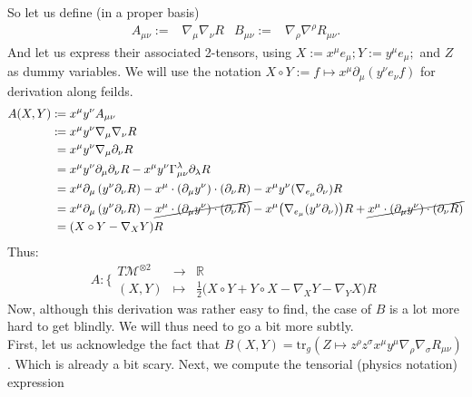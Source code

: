 \documentclass[a4paper,11pt]{article}
\begin{document}
\noindent So let us define (in a proper basis)
\begin{align}
    A_{\mu\nu} :=& \nabla_\mu\nabla_\nu R&
    B_{\mu\nu} :=& \nabla_\rho\nabla^\rho R_{\mu\nu}.
\end{align}
And let us express their associated 2-tensors, using $X:=x^\mu e_\mu; Y:=y^\mu e_\mu;$ and $Z$ as dummy variables. We will use the notation $X\circ Y:= f \mapsto x^\mu \partial_\mu (y^\nu e_\nu f)$ for derivation along feilds.
\begin{align*}
    A(X,Y) :\!\!&= x^\mu y^\nu A_{\mu\nu}\\
    :\!\!&= x^\mu y^\nu \nabla_\mu \nabla_\nu R\\
    &= x^\mu y^\nu \nabla_\mu \partial_\nu R\\
    &= x^\mu y^\nu \partial_\mu \partial_\nu R - x^\mu y^\nu \Gamma_{\mu\nu}^\lambda \partial_\lambda R\\
    &= x^\mu \partial_\mu \left(y^\nu \partial_\nu R \right) - x^\mu \cdot(\partial_\mu y^\nu) \cdot (\partial_\nu R) - x^\mu y^\nu (\nabla_{e_\mu} \partial_\nu)R\\
    &= x^\mu \partial_\mu \left(y^\nu \partial_\nu R \right) - \cancel{x^\mu \cdot(\partial_\mu y^\nu) \cdot (\partial_\nu R)} - x^\mu \big(\nabla_{e_\mu} (y^\nu \partial_\nu)\big)R + \cancel{x^\mu \cdot (\partial_\mu y^\nu) \cdot (\partial_\nu R)}\\
    &= (X\circ Y - \nabla_X Y) R
\end{align*}
Thus:
\begin{equation}
    A : \Bigg\{\begin{matrix}
        T\mathcal{M}^{\otimes 2} & \to & \mathbb{R}\\
        (X,Y) & \mapsto & \frac{1}{2}\big(X\circ Y + Y\circ X - \nabla_X Y - \nabla_Y X\big) R
    \end{matrix}
\end{equation}
Now, although this derivation was rather easy to find, the case of $B$ is a lot more hard to get blindly. We will thus need to go a bit more subtly.
\\
First, let us acknowledge the fact that $B(X,Y)=\mathrm{tr}_g(Z\mapsto z^\rho z^\sigma x^\mu y^\mu \nabla_\rho \nabla_\sigma R_{\mu\nu})$. Which is already a bit scary. Next, we compute the tensorial (physics notation) expression
\end{document}
